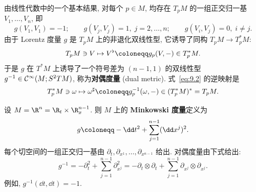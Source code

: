 由线性代数中的一个基本结果, 对每个 $p \in M$, 均存在 $T_p M$ 的一组正交归一基 $V_1, \ldots, V_n$, 即
\begin{equation}\label{eq:9.1}
    g(V_1, V_1) = -1; \qquad g(V_j, V_j) = 1, \; j = 2, \ldots, n; \qquad g(V_i, V_j) = 0, \; i \neq j.
\end{equation}
由于 Lorentz 度量 $g$ 是 $T_p M$ 上的非退化双线性型, 它诱导了同构 $T_p M \to T_p^* M$:
\begin{equation}\label{eq:9.2}
    T_p M \ni V \mapsto V^\flat \defeq g_p(V, -) \in T_p^* M.
\end{equation}
于是 $g$ 在 $T^* M$ 上诱导了一个符号差为 $(n-1, 1)$ 的双线性型 $g^{-1} \in \mathcal{C}^\infty(M; S^2 T M)$, 称为\textbf{对偶度量} (dual metric). 式~\eqref{eq:9.2} 的逆映射是
\begin{equation}\label{eq:9.3}
    T_p^* M \ni \omega \mapsto \omega^\sharp \defeq g_p^{-1}(\omega, -) \in (T_p^* M)^* = T_p M.
\end{equation}

\begin{example}[Minkowski 度量]\label{eg:9.2}
设 $M = \R^n = \R_t \times \R_x^{n-1}$. 则 $M$ 上的 \textbf{Minkowski 度量}定义为
\begin{equation}\label{eq:9.4}
    g \defeq -\dd t^2 + \sum_{j=1}^{n-1} (\dd x^j)^2.
\end{equation}
每个切空间的一组正交归一基由 $\partial_t, \partial_{x^1}, \ldots, \partial_{x^{n-1}}$ 给出. 对偶度量由下式给出:
\begin{equation}\label{eq:9.5}
    g^{-1} = -\partial_t^2 + \sum_{j=1}^{n-1} \partial_{x^j}^2 = -\partial_t \otimes \partial_t + \sum_{j=1}^{n-1} \partial_{x^j} \otimes \partial_{x^j}.
\end{equation}
例如, $g^{-1}(\dd t, \dd t) = -1$.
\end{example}

